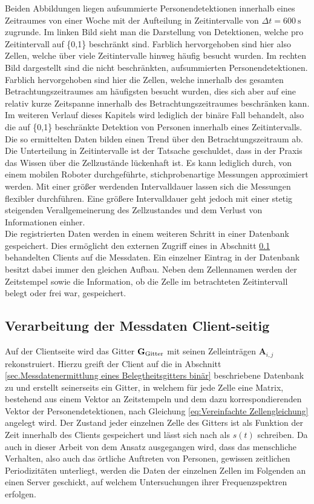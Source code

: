 Beiden Abbildungen liegen aufsummierte Personendetektionen innerhalb eines Zeitraumes von einer Woche mit der Aufteilung in Zeitintervalle von $\Delta t = \SI{600}{\second}$ zugrunde. Im linken Bild sieht man die Darstellung von Detektionen, welche pro Zeitintervall auf \{0,1\} beschränkt sind. Farblich hervorgehoben sind hier also Zellen, welche über viele Zeitintervalle hinweg häufig besucht wurden. Im rechten Bild dargestellt sind die nicht beschränkten, aufsummierten Personendetektionen. Farblich hervorgehoben sind hier die Zellen, welche innerhalb des gesamten Betrachtungszeitraumes am häufigsten besucht wurden, dies sich aber auf eine relativ kurze Zeitspanne innerhalb des Betrachtungszeitraumes beschränken kann. Im weiteren Verlauf dieses Kapitels wird lediglich der binäre Fall behandelt, also die auf \{0,1\} beschränkte Detektion von Personen innerhalb eines Zeitintervalls. Die so ermittelten Daten bilden einen Trend über den Betrachtungszeitraum ab. 
Die Unterteilung in Zeitintervalle ist der Tatsache geschuldet, dass in der Praxis das Wissen über die Zellzustände lückenhaft ist. Es kann lediglich durch, von einem mobilen Roboter durchgeführte, stichprobenartige Messungen approximiert werden. Mit einer größer werdenden Intervalldauer lassen sich die Messungen flexibler durchführen. Eine größere Intervalldauer geht jedoch mit einer stetig steigenden Verallgemeinerung des Zellzustandes und dem Verlust von Informationen einher. \\ 
Die registrierten Daten werden in einem weiteren Schritt in einer Datenbank gespeichert. Dies ermöglicht den externen Zugriff eines in Abschnitt \ref{sec.Verarbeitung client binär} behandelten Clients auf die Messdaten. Ein einzelner Eintrag in der Datenbank besitzt dabei immer den gleichen Aufbau. Neben dem Zellennamen werden der Zeitstempel sowie die Information, ob die Zelle im betrachteten Zeitintervall belegt oder frei war, gespeichert. 

\subsection{Verarbeitung der Messdaten Client-seitig}
\label{sec.Verarbeitung client binär}

Auf der Clientseite wird das Gitter $\mathbf{G}_{\mathrm{Gitter}}$ mit seinen Zelleinträgen $\boldsymbol{A}_{i,j}$ rekonstruiert. Hierzu greift der Client auf die in Abschnitt \ref{sec.Messdatenermittlung eines Belegtheitsgitters binär} beschriebene Datenbank zu und erstellt seinerseits ein Gitter, in welchem für jede Zelle eine Matrix, bestehend aus einem Vektor an Zeitstempeln und dem dazu korrespondierenden Vektor der Personendetektionen, nach Gleichung \ref{eq:Vereinfachte Zellengleichung} angelegt wird.
Der Zustand jeder einzelnen Zelle des Gitters ist als Funktion der Zeit innerhalb des Clients gespeichert und lässt sich nach \cite{Krajnik.2014} als $s(t)$ schreiben. Da auch in dieser Arbeit von dem Ansatz ausgegangen wird, dass das menschliche Verhalten, also auch das örtliche Auftreten von Personen, gewissen zeitlichen Periodizitäten unterliegt, werden die Daten der einzelnen Zellen im Folgenden an einen Server geschickt, auf welchem Untersuchungen ihrer Frequenzspektren erfolgen.

